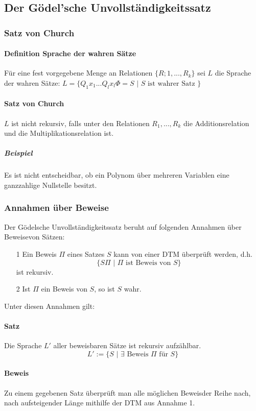 \documentclass[fleqn]{scrartcl}
\begin{document}
\newpage
\subsection{Der Gödel'sche Unvollständigkeitssatz}
\subsubsection{Satz von Church}
\paragraph{Definition Sprache der wahren Sätze}
Für eine fest vorgegebene Menge an Relationen $\{R;1, ..., R_k\}$ sei $L$ die Sprache der wahren Sätze:
$L = \{Q_1x_1 ... Q_lx_l \Phi = S\,\,|\,\, S \text{ ist wahrer Satz } \}$
\paragraph{Satz von Church} $L$ ist nicht rekursiv, falls unter den Relationen $R_1, ..., R_k$ die Additionsrelation und die Multiplikationsrelation ist.

\subparagraph{Beispiel} Es ist nicht entscheidbar, ob ein Polynom über mehreren Variablen eine ganzzahlige Nullstelle besitzt.

\subsubsection{Annahmen über Beweise}
Der Gödelsche Unvollständigkeitssatz beruht auf folgenden Annahmen über \glqq Beweise\grqq von Sätzen:
\begin{itemize}
\item[1] Ein Beweis $\Pi$ eines Satzes $S$ kann von einer DTM überprüft werden, d.h.
\[\{S\Pi \,\, | \,\, \Pi \text{ ist Beweis von }S \}\]
ist rekursiv.
\item[2] Ist $\Pi$ ein Beweis von $S$, so ist $S$ wahr.
\end{itemize}
Unter diesen Annahmen gilt:
\paragraph{Satz} Die Sprache $L'$ aller beweisbaren Sätze ist rekursiv aufzählbar.
\[L' := \{S\,\,|\,\,\exists \text{ Beweis } \Pi \text{ für }S\}\]
\paragraph{Beweis} Zu einem gegebenen Satz überprüft man alle möglichen \glqq Beweis\grqq der Reihe nach, nach aufsteigender Länge mithilfe der DTM aus Annahme 1.
\end{document}
